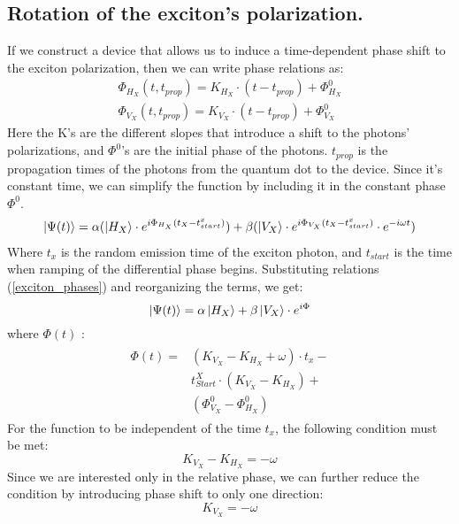 \subsection*{Rotation of the exciton's polarization.}


If we construct a device that allows us to induce a time-dependent phase shift to the exciton polarization, then we can write phase relations as:
\begin{equation} \label{exciton_phases}
	\begin{aligned} 
		&\Phi_{H_{X}}{(t,t_{prop})} = K_{H_{X}}\cdot(t-t_{prop}) + \Phi^0_{H_{X}} &\\
		&\Phi_{V_{X}}{(t,t_{prop})} = K_{V_{X}}\cdot(t-t_{prop}) + \Phi^0_{V_{X}} 
	\end{aligned}
\end{equation}
Here the  K's are the different slopes that introduce a shift to the photons' polarizations, and  $\Phi^0$'s are the initial phase of the photons. $t_{prop}$ is the propagation times of the photons from the quantum dot to the device. Since it's constant time, we can simplify the function by including it in the constant phase $\Phi^0$.
\begin{equation}
	\begin{split}
		\ket{\Psi(t)}= \alpha( \ket{H_{X}}\cdot e^{i\Phi_{H_{X}}(t_{X}-t^{x}_{start})})+
		\beta (\ket{V_{X}}\cdot e^{i\Phi_{V_{X}}(t_{X}-t^{x}_{start})}\cdot e^{-i\omega t})
	\end{split}
\end{equation} 
Where $t_x$ is the random emission time of the exciton photon, and $t_{start}$ is the time when ramping of the differential phase begins. Substituting relations (\ref{exciton_phases}) and reorganizing the terms, we get:
\begin{equation}
	\ket{\Psi(t)} = \alpha\ket{H_X}+\beta\ket{V_X}\cdot e^{i\Phi}
\end{equation}
where $\Phi(t)$ :
\begin{equation}
	\begin{split}  
		\begin{aligned} 
			\Phi(t) = &(K_{V_X}-K_{H_X} + \omega)\cdot t_x -\\
			&t^X_{Start} \cdot(K_{V_X}-K_{H_X})+\\
			&(\Phi^0_{V_{X}}-\Phi^0_{H_{X}})
		\end{aligned}
	\end{split}
\end{equation}
For the function to be independent of the time $t_x$, the following condition must be met:
\begin{equation}
	K_{V_X}-K_{H_X} =-\omega 
\end{equation}
Since we are interested only in the relative phase, we can further reduce the condition by introducing phase shift to only one direction:
\begin{equation}
	K_{V_X} =-\omega 
\end{equation}
